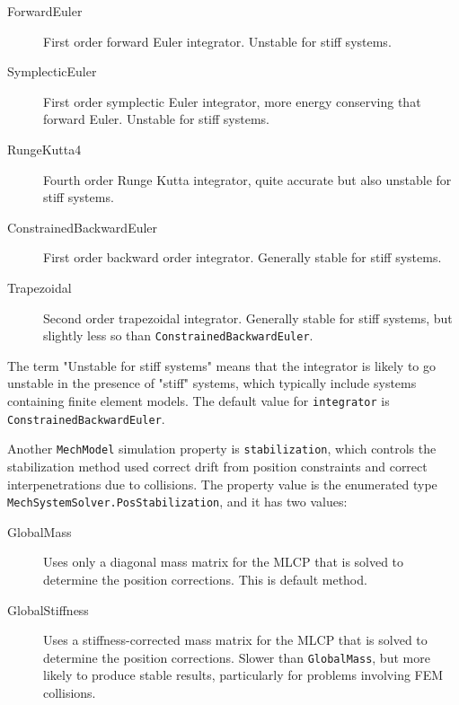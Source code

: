 \begin{description}

\item[ForwardEuler]\mbox{}

First order forward Euler integrator. Unstable for stiff systems.

\item[SymplecticEuler]\mbox{}

First order symplectic Euler integrator, more energy conserving
that forward Euler. Unstable for stiff systems.

\item[RungeKutta4]\mbox{}

Fourth order Runge Kutta integrator, quite accurate but also unstable
for stiff systems.

\item[ConstrainedBackwardEuler]\mbox{}

First order backward order integrator. Generally stable for stiff systems.

\item[Trapezoidal]\mbox{}

Second order trapezoidal integrator. Generally stable for stiff
systems, but slightly less so than {\tt ConstrainedBackwardEuler}.

\end{description}

The term "Unstable for stiff systems" means that the integrator is
likely to go unstable in the presence of "stiff" systems, which
typically include systems containing finite element models.  The
default value for {\tt integrator} is {\tt ConstrainedBackwardEuler}.

Another {\tt MechModel} simulation property is {\tt stabilization},
which controls the stabilization method used correct drift from
position constraints and correct interpenetrations due to collisions.
The property value is the enumerated type {\tt
MechSystemSolver.PosStabilization}, and it has two values:

\begin{description}

\item[GlobalMass]\mbox{}

Uses only a diagonal mass matrix for the MLCP that is solved to
determine the position corrections. This is default method.

\item[GlobalStiffness]\mbox{}

Uses a stiffness-corrected mass matrix for the MLCP that is solved to
determine the position corrections. Slower than {\tt GlobalMass}, but
more likely to produce stable results, particularly for
problems involving FEM collisions.

\end{description}




